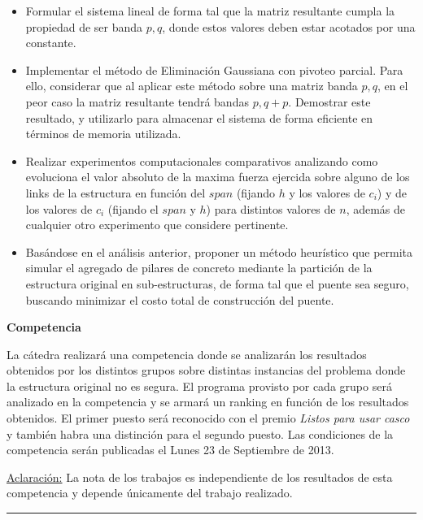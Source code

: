 \begin{itemize}
\item Formular el sistema lineal de forma tal que la matriz resultante cumpla la propiedad de ser banda $p,q$, donde
estos valores deben estar acotados por una constante. 

\item Implementar el m\'etodo de Eliminaci\'on Gaussiana con pivoteo parcial. Para ello, considerar que al aplicar este
m\'etodo
sobre una matriz banda $p,q$, en el peor caso la matriz resultante tendr\'a bandas $p,q+p$. Demostrar este resultado, y
utilizarlo para almacenar el sistema de forma eficiente en t\'erminos de memoria utilizada.

\item Realizar experimentos computacionales comparativos analizando como evoluciona el valor absoluto de la maxima fuerza ejercida
sobre alguno de los links de la estructura en funci\'on del $span$ (fijando $h$ y los valores de $c_i$) y de los
valores de $c_i$ (fijando el $span$ y $h$) para distintos valores de $n$, adem\'as de cualquier otro experimento que
considere pertinente.

\item Bas\'andose en el an\'alisis anterior, proponer un m\'etodo heur\'istico que permita simular el agregado de
pilares de concreto mediante la partici\'on de la estructura original en sub-estructuras, de forma tal que el puente 
sea seguro, buscando minimizar el costo total de construcci\'on del puente.
\end{itemize}

\textbf{Competencia}

La c\'atedra realizar\'a una competencia donde se analizar\'an los resultados obtenidos por los distintos grupos sobre
distintas instancias del problema donde la estructura original no es segura. El programa provisto por cada grupo ser\'a
analizado en la competencia y se armar\'a un ranking en funci\'on de los resultados obtenidos. El primer puesto ser\'a
reconocido con el premio \emph{Listos para usar casco} y tambi\'en habra una distinci\'on para el segundo puesto. 
Las condiciones de la competencia ser\'an publicadas el Lunes 23 de Septiembre de 2013.

\underline{Aclaraci\'on:} La nota de los trabajos es independiente de los resultados de esta competencia y depende \'unicamente del
trabajo realizado.

\vskip 15pt

\hrule

\vskip 11pt


